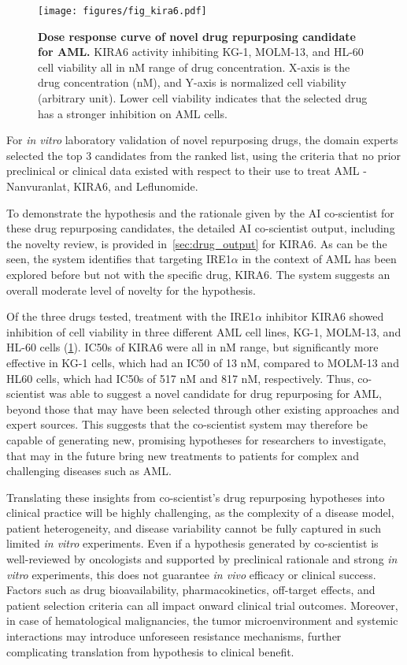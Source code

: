 \begin{figure}[ht!]
\centering
\texttt{[image: figures/fig\_kira6.pdf]}
\vspace{0.1cm}
\caption{\textbf{Dose response curve of novel drug repurposing candidate for AML.} KIRA6 activity inhibiting KG-1, MOLM-13, and HL-60 cell viability all in nM range of drug concentration. X-axis is the drug concentration (nM), and Y-axis is normalized cell viability (arbitrary unit). Lower cell viability indicates that the selected drug has a stronger inhibition on AML cells.}
\label{fig:fig_wetlab_novel}
\end{figure}

For \textit{in vitro} laboratory validation of novel repurposing drugs, the domain experts selected the top 3 candidates from the ranked list, using the criteria that no prior preclinical or clinical data existed with respect to their use to treat AML - Nanvuranlat, KIRA6, and Leflunomide. 


To demonstrate the hypothesis and the rationale given by the AI co-scientist for these drug repurposing candidates, the detailed AI co-scientist output, including the novelty review, is provided in~\cref{sec:drug_output} for KIRA6. As can be the seen, the system identifies that targeting IRE1$\alpha$ in the context of AML has been explored before but not with the specific drug, KIRA6. The system suggests an overall moderate level of novelty for the hypothesis.


Of the three drugs tested, treatment with the IRE1$\alpha$ inhibitor KIRA6 showed inhibition of cell viability in three different AML cell lines, KG-1, MOLM-13, and HL-60 cells (\cref{fig:fig_wetlab_novel}). IC50s of KIRA6 were all in nM range, but significantly more effective in KG-1 cells, which had an IC50 of 13 nM, compared to MOLM-13 and HL60 cells, which had IC50s of 517 nM and 817 nM, respectively. Thus, co-scientist was able to suggest a novel candidate for drug repurposing for AML, beyond those that may have been selected through other existing approaches and expert sources. This suggests that the co-scientist system may therefore be capable of generating new, promising hypotheses for researchers to investigate, that may in the future bring new treatments to patients for complex and challenging diseases such as AML.

Translating these insights from co-scientist's drug repurposing hypotheses into clinical practice will be highly challenging, as the complexity of a disease model, patient heterogeneity, and disease variability cannot be fully captured in such limited \textit{in vitro} experiments. Even if a hypothesis generated by co-scientist is well-reviewed by oncologists and supported by preclinical rationale and strong \textit{in vitro} experiments, this does not guarantee \textit{in vivo} efficacy or clinical success. Factors such as drug bioavailability, pharmacokinetics, off-target effects, and patient selection criteria can all impact onward clinical trial outcomes. Moreover, in case of hematological malignancies, the tumor microenvironment and systemic interactions may introduce unforeseen resistance mechanisms, further complicating translation from hypothesis to clinical benefit.


